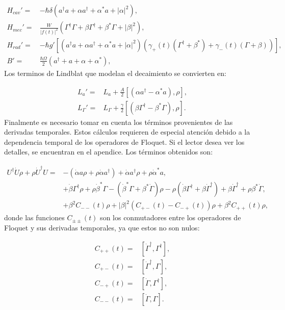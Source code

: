 \documentclass[a4paper,10pt]{report}
\begin{document}
\begin{align}
H_{cav}' =& -\hbar \delta(a^{\dagger}a +\alpha a^{\dagger}+\alpha^* a + |\alpha|^2),\\
H_{mec}' =& \frac{W}{|f(t)|^2}(\Gamma^{\dagger}\Gamma + \beta \Gamma^{\dagger} + \beta^* \Gamma + |\beta|^2 ),\\
H_{rad}'=&-\hbar g'[(a^{\dagger}a +\alpha a^{\dagger}+\alpha^* a + |\alpha|^2)(\gamma_+(t)(\Gamma^{\dagger}+\beta^*)+\gamma_-(t)(\Gamma+\beta))],\\
B' =& \frac{\hbar \Omega}{2}(a^{\dagger} + a +\alpha + \alpha^*),
\end{align}Los terminos de Lindblat que modelan el decaimiento se convierten en:

\begin{align}
L_a ' =& L_a + \frac{A}{2}[(\alpha a^\dagger - \alpha^*a),\rho], \\
L_{\Gamma}' =& L_{\Gamma} + \frac{\gamma}{2}[(\beta\Gamma^{\dagger}-\beta^* \Gamma),\rho].
\end{align}Finalmente es necesario tomar en cuenta los términos provenientes de las derivadas temporales. Estos cálculos requieren de especial atención debido a la dependencia temporal de los operadores de Floquet. Si el lector desea ver los detalles, se encuentran en el apendice. Los términos obtenidos son:

\begin{align*}
U^{\dagger}\dot{U}\rho + \rho \dot{U}^\dagger U =& -(\dot{\alpha}a \rho + \rho\dot{\alpha}a^{\dagger}) + \dot{\alpha}a^{\dagger}\rho + \rho \dot{\alpha}^*a,\\
&+ \dot{\beta}\Gamma^{\dagger}\rho + \rho\dot{\beta}^*\Gamma-(\dot{\beta}^*\Gamma + \beta^*\dot{\Gamma})\rho - \rho(\dot{\beta} \Gamma^{\dagger} + \beta \dot{\Gamma}^{\dagger}) +\beta \dot{\Gamma}^{\dagger} + \rho\beta^* \dot{\Gamma},\\
&+\beta^2C_{--}(t)\rho + |\beta|^2(C_{+-}(t) - C_{-+}(t))\rho +  \beta^2 C_{++}(t)\rho,
\end{align*} donde las funciones $C_{\pm \pm}(t)$ son los conmutadores entre los operadores de Floquet y sus derivadas temporales, ya que estos no son nulos:

\begin{align*}
C_{++}(t) =& [\dot{\Gamma}^{\dagger}, \Gamma^{\dagger}],\\
C_{+-}(t) =& [\dot{\Gamma}^{\dagger}, \Gamma],\\
C_{-+}(t) =& [\dot{\Gamma}, \Gamma^{\dagger}],\\
C_{--}(t) =& [\dot{\Gamma}, \Gamma].
\end{align*} 
 
\end{document}
